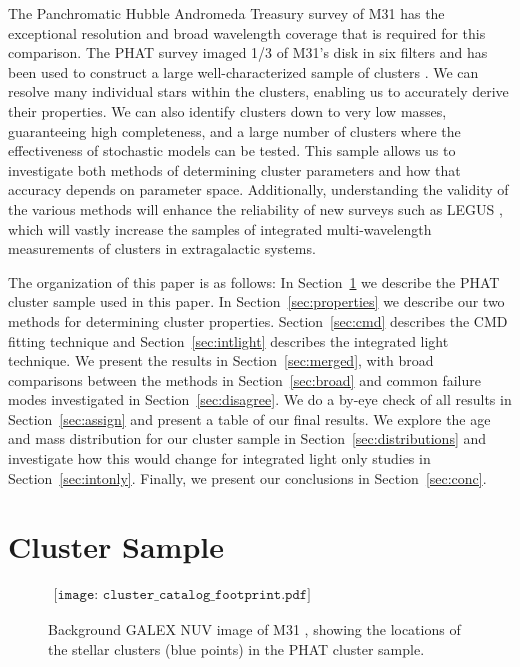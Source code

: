\documentclass{emulateapj}
\begin{document}
The Panchromatic Hubble Andromeda Treasury  \citep[PHAT;][] {Dalcanton12} survey of M31 has the exceptional resolution and broad wavelength coverage that is required for this comparison.  The PHAT survey imaged 1/3 of M31's disk in six filters \citep{Williams14} and has been used to construct a large well-characterized sample of clusters \citep{Johnson15}.  We can resolve many individual stars within the clusters, enabling us to accurately derive their properties.  We can also identify clusters down to very low masses, guaranteeing high completeness, and a large number of clusters where the effectiveness of stochastic models can be tested.  This sample allows us to investigate both methods of determining cluster parameters and how that accuracy depends on parameter space.  Additionally, understanding the validity of the various methods will enhance the reliability of new surveys such as LEGUS \citep{Calzetti15}, which will vastly increase the samples of integrated multi-wavelength measurements of clusters in extragalactic systems.

The organization of this paper is as follows:  In Section~\ref{sec:sample} we describe the PHAT cluster sample used in this paper.  In Section~\ref{sec:properties} we describe our two methods for determining cluster properties.  Section~\ref{sec:cmd} describes the CMD fitting technique and Section~\ref{sec:intlight} describes the integrated light technique.  We present the results in Section~\ref{sec:merged}, with broad comparisons between the methods in Section~\ref{sec:broad} and common failure modes investigated in Section~\ref{sec:disagree}.  We do a by-eye check of all results in Section~\ref{sec:assign} and present a table of our final results.  We explore the age and mass distribution for our cluster sample in Section~\ref{sec:distributions} and investigate how this would change for integrated light only studies in Section~\ref{sec:intonly}.  Finally, we present our conclusions in Section~\ref{sec:conc}.




\section{Cluster Sample} \label{sec:sample}



\begin{figure}[ht!]
   \begin{center}$
      \begin{array}{cc}
         \texttt{[image: cluster\_catalog\_footprint.pdf]} 
      \end{array}$
   \end{center}
  \caption{Background GALEX NUV image of M31 \citep{Thilker05}, showing the locations of the stellar clusters (blue points) in the PHAT cluster sample. }
  \label{fig:agedist}
\end{figure}
\end{document}
